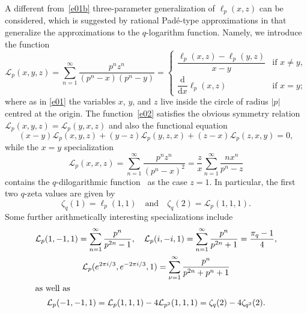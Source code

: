 \documentclass[12pt,reqno]{amsart}
\theoremstyle{remark}
\renewcommand{\d}{{\mathrm d}}
\newcommand\cL{\mathcal{L}}
\begin{document}
A different from~\eqref{e01b} three-parameter generalization of $\ell_p(x,z)$ can be considered,
which is suggested by rational Pad\'e-type approximations in \cite{BV05,BV09,SvA09,Zu02a,Zu06} that generalize
the approximations to the $q$-logarithm function. Namely, we introduce the function
\begin{equation}
\cL_p(x,y,z)
=\sum_{n=1}^\infty\frac{p^nz^n}{(p^n-x)(p^n-y)}
=\begin{cases}
\dfrac{\ell_p(x,z)-\ell_p(y,z)}{x-y} &\text{if $x\ne y$}, \\[1.5mm]
\dfrac{\d}{\d x}\ell_p(x,z) &\text{if $x=y$};
\end{cases}
\label{e02}
\end{equation}
where as in \eqref{e01} the variables $x$, $y$, and $z$ live inside the circle
of radius $|p|$ centred at the origin. The function~\eqref{e02}
satisfies the obvious symmetry relation $\cL_p(x,y,z)=\cL_p(y,x,z)$ and also the functional equation
\begin{equation*}
(x-y)\cL_p(x,y,z)
+(y-z)\cL_p(y,z,x)
+(z-x)\cL_p(z,x,y)
=0,
\end{equation*}
while the $x=y$ specialization
\begin{equation}
\cL_p(x,x,z)
=\sum_{n=1}^\infty\frac{p^nz^n}{(p^n-x)^2}
=\frac zx\sum_{n=1}^\infty\frac{nx^n}{p^n-z}
\label{e03}
\end{equation}
contains the $q$-dilogarithmic function~\cite{Zu06} as the case $z=1$.
In particular, the first two $q$-zeta values \cite{Zu02b} are given by
$$
\zeta_q(1)=\ell_p(1,1)
\quad\text{and}\quad
\zeta_q(2)=\cL_p(1,1,1).
$$
Some further arithmetically interesting specializations include
\begin{gather*}
\cL_p(1,-1,1)=\sum_{n=1}^\infty\frac{p^n}{p^{2n}-1},
\quad
\cL_p(i,-i,1)=\sum_{n=1}^\infty\frac{p^n}{p^{2n}+1}=\frac{\pi_q-1}4,
\\
\cL_p(e^{2\pi i/3},e^{-2\pi i/3},1)=\sum_{\nu=1}^\infty\frac{p^n}{p^{2n}+p^n+1}
\\ \intertext{as well as}
\cL_p(-1,-1,1)=\cL_p(1,1,1)-4\cL_{p^2}(1,1,1)=\zeta_q(2)-4\zeta_{q^2}(2).
\end{gather*}
\end{document}
